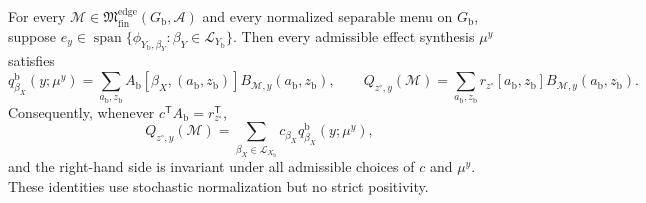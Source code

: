 For every \(\mathcal M\in\mathfrak M_{\mathrm{fin}}^{\mathrm{edge}}(G_{\mathrm b},\mathcal A)\) and every normalized separable menu on \(G_{\mathrm b}\), suppose \(e_y\in\operatorname{span}\{\phi_{Y_{\mathrm b},\beta_Y}:\beta_Y\in\mathcal L_{Y_{\mathrm b}}\}\).  Then every admissible effect synthesis \(\mu^y\) satisfies
\[
q^{\mathrm b}_{\beta_X}(y;\mu^y)
=\sum_{a_{\mathrm b},z_{\mathrm b}}A_{\mathrm b}[\beta_X,(a_{\mathrm b},z_{\mathrm b})]
B_{\mathcal M,y}(a_{\mathrm b},z_{\mathrm b}),
\qquad
Q_{z^{\circ},y}(\mathcal M)
=\sum_{a_{\mathrm b},z_{\mathrm b}}r_{z^{\circ}}[a_{\mathrm b},z_{\mathrm b}]
B_{\mathcal M,y}(a_{\mathrm b},z_{\mathrm b}).
\]
Consequently, whenever \(c^{\mathsf T}A_{\mathrm b}=r_{z^{\circ}}^{\mathsf T}\),
\[
Q_{z^{\circ},y}(\mathcal M)=
\sum_{\beta_X\in\mathcal L_{X_{\mathrm b}}}c_{\beta_X}q^{\mathrm b}_{\beta_X}(y;\mu^y),
\]
and the right-hand side is invariant under all admissible choices of \(c\) and \(\mu^y\).  These identities use stochastic normalization but no strict positivity.